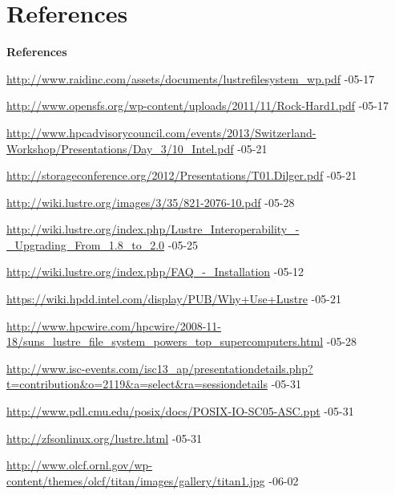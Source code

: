 \section{References}

\begin{frame}{\textbf{References}}
    \tiny
    \begin{thebibliography}{1}
        \beamertemplatetextbibitems

            \url{http://www.raidinc.com/assets/documents/lustrefilesystem_wp.pdf} -05-17

            \url{http://www.opensfs.org/wp-content/uploads/2011/11/Rock-Hard1.pdf} -05-17

            \url{http://www.hpcadvisorycouncil.com/events/2013/Switzerland-Workshop/Presentations/Day_3/10_Intel.pdf} -05-21

            \url{http://storageconference.org/2012/Presentations/T01.Dilger.pdf} -05-21

            \url{http://wiki.lustre.org/images/3/35/821-2076-10.pdf} -05-28

            \url{http://wiki.lustre.org/index.php/Lustre_Interoperability_-_Upgrading_From_1.8_to_2.0} -05-25

            \url{http://wiki.lustre.org/index.php/FAQ_-_Installation} -05-12

            \url{https://wiki.hpdd.intel.com/display/PUB/Why+Use+Lustre} -05-21

            \url{http://www.hpcwire.com/hpcwire/2008-11-18/suns_lustre_file_system_powers_top_supercomputers.html} -05-28

            \url{http://www.isc-events.com/isc13_ap/presentationdetails.php?t=contribution&o=2119&a=select&ra=sessiondetails} -05-31

            \url{http://www.pdl.cmu.edu/posix/docs/POSIX-IO-SC05-ASC.ppt} -05-31

            \url{http://zfsonlinux.org/lustre.html} -05-31

            \url{http://www.olcf.ornl.gov/wp-content/themes/olcf/titan/images/gallery/titan1.jpg} -06-02

    \end{thebibliography}
\end{frame}
